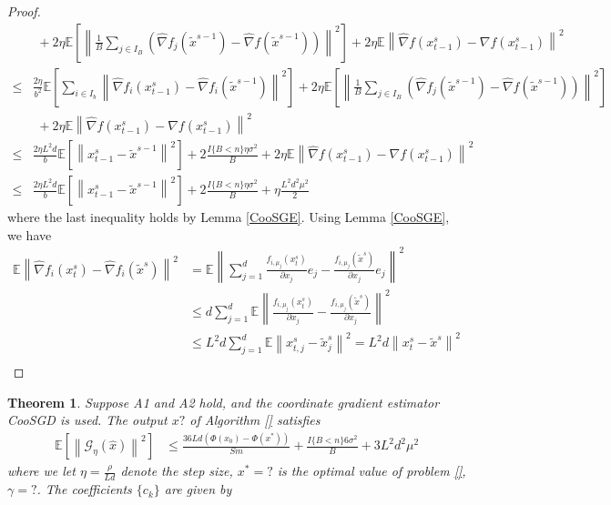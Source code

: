 \documentclass{article}
\newcommand*{\G}{\mathcal{G}}
\newcommand*{\E}{\mathbb{E}}
\newcommand{\norm}[1]{\left\lVert#1\right\rVert}
\newtheorem{theorem}{Theorem}[section]
\theoremstyle{definition}
\theoremstyle{remark}
\begin{document}
\begin{proof}
{\begin{align}
   &\,\, \label{eq27}+ 2\eta \E \left[ \norm{\frac{1}{B}\sum_{j\in I_B}\left(\hat{\nabla} f_j(\widetilde{x}^{s-1}) - \hat{\nabla} f(\tilde{x}^{s-1})\right)}^2\right]+2\eta \E \norm{\hat{\nabla} f(x_{t-1}^s)-\nabla f(x_{t-1}^s)}^2\\
   \leq  &\label{eq28}\frac{2\eta}{b^2}\E\left[\sum_{i\in I_b}\norm{\hat{\nabla} f_i(x_{t-1}^s)-\hat{\nabla} f_i(\widetilde{x}^{s-1})}^2\right]+ 2\eta \E \left[ \norm{\frac{1}{B}\sum_{j\in I_B}\left(\hat{\nabla} f_j(\widetilde{x}^{s-1}) - \hat{\nabla} f(\tilde{x}^{s-1})\right)}^2\right]\\
   &\,\,+2\eta \E \norm{\hat{\nabla} f(x_{t-1}^s)-\nabla f(x_{t-1}^s)}^2\\
   \leq  &\label{eq29}\frac{2\eta L^2 d}{b}\E\left[\norm{x_{t-1}^s-\widetilde{x}^{s-1}}^2\right]+ 2\frac{I\{B < n\}\eta \sigma ^2}{B}+2\eta \E \norm{\hat{\nabla} f(x_{t-1}^s)-\nabla f(x_{t-1}^s)}^2\\
   \leq  &\label{eq29}\frac{2\eta L^2 d}{b}\E\left[\norm{x_{t-1}^s-\widetilde{x}^{s-1}}^2\right]+ 2\frac{I\{B < n\}\eta \sigma ^2}{B}+\eta \frac{L^2 d^2 \mu^2}{2}
 \end{align}
 }
 where the last inequality holds by Lemma \ref{CooSGE}. Using Lemma \ref{CooSGE}, we have 
 \begin{equation}
 \begin{split}
 \E \norm{\hat{\nabla} f_i(x_{t}^s)-\hat{\nabla} f_i(\tilde{x}^s)}^2 &= \E \norm{ \sum_{j=1}^d\frac{f_{i,\mu_j}(x_{t}^s)}{\partial x_j}e_j-\frac{f_{i,\mu_j}(\tilde{x}^s)}{\partial x_j}e_j}^2\\
 &\leq d \sum_{j=1}^d \E \norm{ \frac{f_{i,\mu_j}(x_{t}^s)}{\partial x_j}-\frac{f_{i,\mu_j}(\tilde{x}^s)}{\partial x_j}}^2\\
 &\leq L^2 d \sum_{j=1}^d \E \norm{x_{t,j}^s-\tilde{x}_{j}^s}^2 = L^2 d \norm{x_{t}^s-\tilde{x}^s}^2\\
 \end{split}
 \end{equation}
 
\end{proof}
\begin{theorem}
Suppose A1 and A2 hold, and the coordinate gradient estimator CooSGD is used. The output $x?$ of Algorithm \ref{} satisfies
  \begin{equation}
  \begin{split}
\E[\norm{\G_{\eta}(\hat{x})}^2] & \leq \frac{36Ld\left(\Phi(x_0) - \Phi({x}^*)\right)}{Sm} + \frac{I\{B < n\}6 \sigma ^2}{B}+3{L^2 d^2 \mu^2}
\end{split}
 \end{equation}
where we let $\eta = \frac{\rho}{Ld}$ denote the step size, $x^*=?$ is the optimal value of problem \ref{}, $\gamma = ?$. The coefficients $\{c_k\}$ are given by

\end{theorem}
\end{document}
